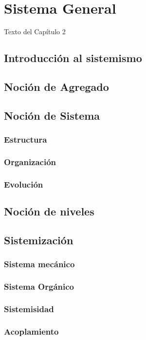 
\chapter{Sistema General}

Texto del Capítulo 2

\section{Introducción al sistemismo}
\section{Noción de Agregado}
\section{Noción de Sistema}
\subsection{Estructura}
\subsection{Organización}
\subsection{Evolución}
\section{Noción de niveles}
\section{Sistemización}
\subsection{Sistema mecánico}
\subsection{Sistema Orgánico}
\subsection{Sistemisidad}
\subsection{Acoplamiento}
